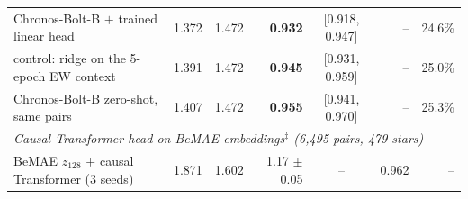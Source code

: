 \begin{tabular}{lrrrcrr}
  Chronos-Bolt-B $+$ trained linear head & 1.372 & 1.472 & \textbf{0.932} & [0.918, 0.947] & -- & 24.6\% \\
  \quad control: ridge on the 5-epoch EW context & 1.391 & 1.472 & \textbf{0.945} & [0.931, 0.959] & -- & 25.0\% \\
  \quad Chronos-Bolt-B zero-shot, same pairs & 1.407 & 1.472 & \textbf{0.955} & [0.941, 0.970] & -- & 25.3\% \\
  \midrule
  \multicolumn{7}{l}{\emph{Causal Transformer head on BeMAE embeddings$^{\ddagger}$ (6{,}495 pairs, 479 stars)}} \\
  BeMAE $z_{128}$ $+$ causal Transformer (3 seeds) & 1.871 & 1.602 & 1.17 $\pm$ 0.05 & -- & 0.962 & -- \\
  \bottomrule
\end{tabular}
